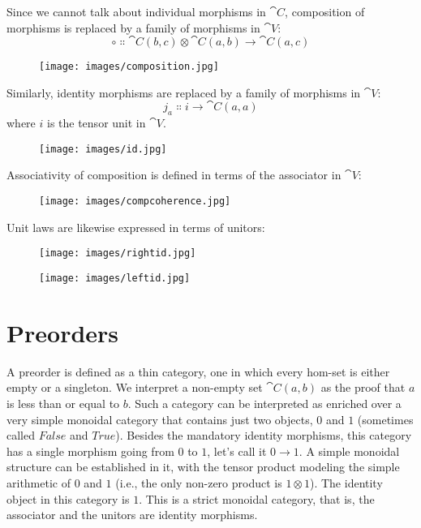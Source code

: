 Since we cannot talk about individual morphisms in $\cat{C}$, composition
of morphisms is replaced by a family of morphisms in $\cat{V}$:
\[\circ \Colon \cat{C}(b, c) \otimes \cat{C}(a, b) \to \cat{C}(a, c)\]

\begin{figure}[H]
\centering
\texttt{[image: images/composition.jpg]}
\end{figure}

\noindent
Similarly, identity morphisms are replaced by a family of morphisms in
$\cat{V}$:
\[j_a \Colon i \to \cat{C}(a, a)\]
where $i$ is the tensor unit in $\cat{V}$.

\begin{figure}[H]
\centering
\texttt{[image: images/id.jpg]}
\end{figure}

\noindent
Associativity of composition is defined in terms of the associator in
$\cat{V}$:

\begin{figure}[H]
\centering
\texttt{[image: images/compcoherence.jpg]}
\end{figure}

\noindent
Unit laws are likewise expressed in terms of unitors:

\begin{figure}[H]
\centering
\texttt{[image: images/rightid.jpg]}
\end{figure}

\begin{figure}[H]
\centering
\texttt{[image: images/leftid.jpg]}
\end{figure}

\section{Preorders}

A preorder is defined as a thin category, one in which every hom-set is
either empty or a singleton. We interpret a non-empty set
$\cat{C}(a, b)$ as the proof that $a$ is less than or equal to
$b$. Such a category can be interpreted as enriched over a very
simple monoidal category that contains just two objects, $0$ and $1$
(sometimes called $False$ and $True$). Besides the mandatory identity
morphisms, this category has a single morphism going from $0$ to $1$, let's
call it $0 \to 1$. A simple monoidal structure can be
established in it, with the tensor product modeling the simple
arithmetic of $0$ and $1$ (i.e., the only non-zero product is $1 \otimes 1$).
The identity object in this category is $1$. This is a strict monoidal
category, that is, the associator and the unitors are identity
morphisms.

